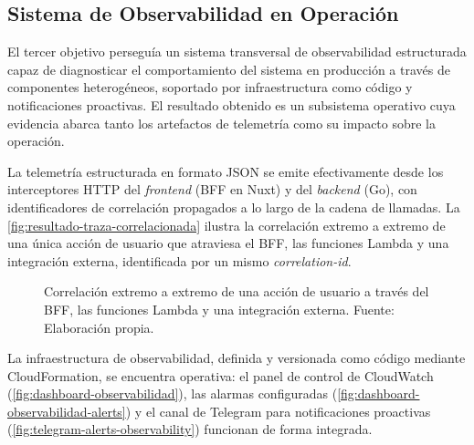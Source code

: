 \subsection{Sistema de Observabilidad en Operación}\label{subsec:resultado-c}

El tercer objetivo perseguía un sistema transversal de observabilidad estructurada capaz de diagnosticar el comportamiento del sistema en producción a través de componentes heterogéneos, soportado por infraestructura como código y notificaciones proactivas. El resultado obtenido es un subsistema operativo cuya evidencia abarca tanto los artefactos de telemetría como su impacto sobre la operación.

La telemetría estructurada en formato JSON se emite efectivamente desde los interceptores HTTP del \textit{frontend} (BFF en Nuxt) y del \textit{backend} (Go), con identificadores de correlación propagados a lo largo de la cadena de llamadas. La \autoref{fig:resultado-traza-correlacionada} ilustra la correlación extremo a extremo de una única acción de usuario que atraviesa el BFF, las funciones Lambda y una integración externa, identificada por un mismo \textit{correlation-id}.

\newcommand\resultadoTrazaCaption{Correlación extremo a extremo de una acción de usuario a través del BFF, las funciones Lambda y una integración externa. \hspace{1em}}
\begin{figure}[H]
  \centering
  \caption[\resultadoTrazaCaption]{\resultadoTrazaCaption Fuente: Elaboración propia.}
  \label{fig:resultado-traza-correlacionada}
\end{figure}

La infraestructura de observabilidad, definida y versionada como código mediante CloudFormation, se encuentra operativa: el panel de control de CloudWatch (\autoref{fig:dashboard-observabilidad}), las alarmas configuradas (\autoref{fig:dashboard-observabilidad-alerts}) y el canal de Telegram para notificaciones proactivas (\autoref{fig:telegram-alerts-observability}) funcionan de forma integrada.

